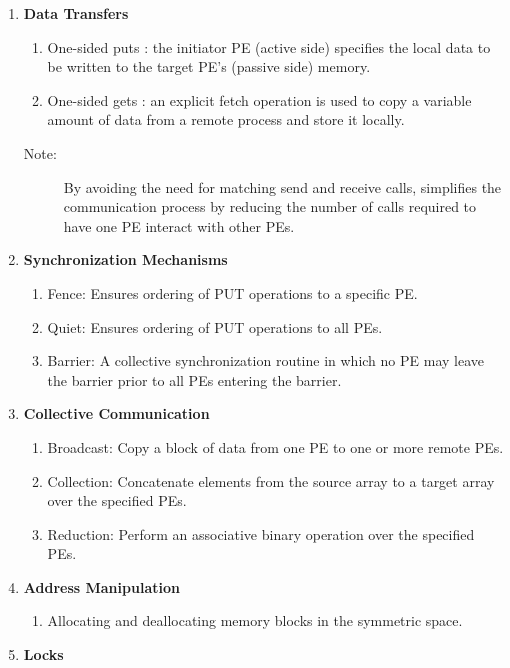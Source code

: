 \begin{enumerate}
\item \textbf{Data Transfers }

\begin{enumerate}
\item One-sided puts : the initiator \ac{PE} (active side) specifies the local
data to be written to the target \ac{PE}'s (passive side) memory. 
\item One-sided gets : an explicit fetch operation is used to copy a variable
amount of data from a remote process and store it locally.\end{enumerate}
\begin{description}
\item [{{Note:}}] By avoiding the need for matching send and receive
calls, \openshmem simplifies the communication process by reducing the
number of calls required to have one \ac{PE} interact with other \ac{PE}s. 
\end{description}
\item \textbf{Synchronization Mechanisms }

\begin{enumerate}
\item Fence: Ensures ordering of PUT operations to a specific \ac{PE}. 
\item Quiet: Ensures ordering of PUT operations to all \ac{PE}s. 
\item Barrier: A collective synchronization routine in which no \ac{PE} may leave
the barrier prior to all \ac{PE}s entering the barrier. 
\end{enumerate}
\item \textbf{Collective Communication}

\begin{enumerate}
\item Broadcast: Copy a block of data from one \ac{PE} to one or more remote
PEs. 
\item Collection: Concatenate elements from the source array to a target
array over the specified \ac{PE}s. 
\item Reduction: Perform an associative binary operation over the specified
\ac{PE}s. 
\end{enumerate}
\item \textbf{Address Manipulation}

\begin{enumerate}
\item Allocating and deallocating memory blocks in the symmetric space.
\end{enumerate}
\item \textbf{Locks}


\end{enumerate}
